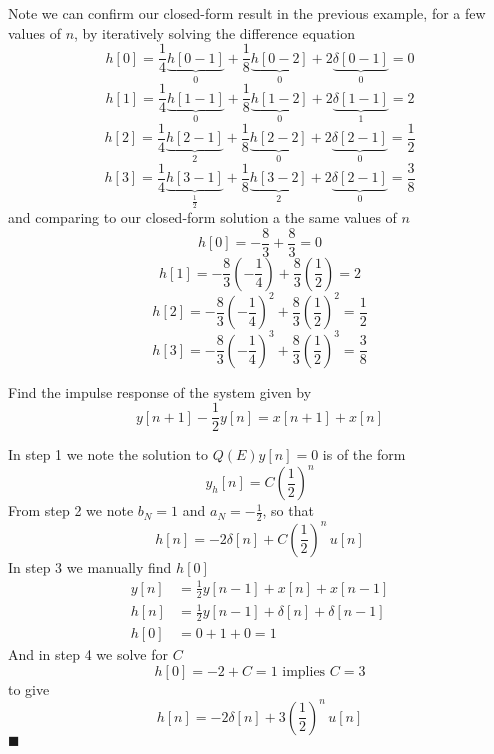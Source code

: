   Note we can confirm our closed-form result in the previous example, for a few values of $n$, by iteratively solving the difference equation
  \[
    h[0] = \frac{1}{4}\underbrace{h[0-1]}_{0} + \frac{1}{8}\underbrace{h[0-2]}_{0} + 2\underbrace{\delta[0-1]}_{0} = 0
  \]
  \[
      h[1] = \frac{1}{4}\underbrace{h[1-1]}_{0} + \frac{1}{8}\underbrace{h[1-2]}_{0} + 2\underbrace{\delta[1-1]}_{1} = 2
    \]
    \[
      h[2] = \frac{1}{4}\underbrace{h[2-1]}_{2} + \frac{1}{8}\underbrace{h[2-2]}_{0} + 2\underbrace{\delta[2-1]}_{0} = \frac{1}{2}
    \]
    \[
      h[3] = \frac{1}{4}\underbrace{h[3-1]}_{\frac{1}{2}} + \frac{1}{8}\underbrace{h[3-2]}_{2} + 2\underbrace{\delta[2-1]}_{0} = \frac{3}{8}
    \]
    and comparing to our closed-form solution a the same values of $n$
    \[
    h[0] = -\frac{8}{3} + \frac{8}{3} = 0
    \]
    \[
    h[1] = -\frac{8}{3}\left( -\frac{1}{4}\right) + \frac{8}{3}\left( \frac{1}{2}\right) = 2
    \]
    \[
    h[2] = -\frac{8}{3}\left( -\frac{1}{4}\right)^2 + \frac{8}{3}\left( \frac{1}{2}\right)^2 = \frac{1}{2}
    \]
    \[
    h[3] = -\frac{8}{3}\left( -\frac{1}{4}\right)^3 + \frac{8}{3}\left( \frac{1}{2}\right)^3 = \frac{3}{8}
    \]

\begin{example}
  Find the impulse response of the system given by
  \[
  y[n+1] - \frac{1}{2}y[n] = x[n+1] + x[n]
  \]

  In step 1 we note the solution to $Q(E)y[n] = 0$ is of the form
  \[
  y_h[n] = C\left( \frac{1}{2}\right)^n
  \]
  From step 2 we note $b_N = 1$ and $a_N = -\frac{1}{2}$, so that
  \[
  h[n] = -2\delta[n]  +  C\left( \frac{1}{2}\right)^n\, u[n]
  \]
  In step 3 we manually find $h[0]$
  \begin{align*}
    y[n] &= \frac{1}{2}y[n-1] + x[n] + x[n-1]\\
    h[n] &= \frac{1}{2}y[n-1] + \delta[n] + \delta[n-1]\\
    h[0] &= 0 + 1 + 0 = 1
  \end{align*}
  And in step 4 we solve for $C$
  \[
  h[0] = -2  +  C = 1 \mbox{ implies } C = 3
  \]
  to give
  \[
  h[n] = -2\delta[n]  +  3\left( \frac{1}{2}\right)^n\, u[n]
  \]
  $\blacksquare$
\end{example}

